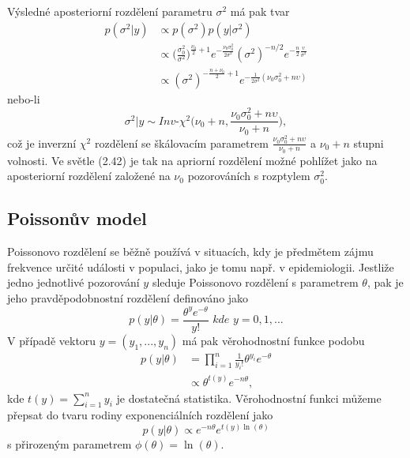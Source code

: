 Výsledné aposteriorní rozdělení parametru $\sigma^2$ má pak tvar
\begin{equation}
\begin{split}
p(\sigma^2 | y) & \varpropto p(\sigma^2)p(y | \sigma^2)\\
 & \varpropto \Big(\frac{\sigma_0^2}{\sigma^2}\Big)^{\frac{\nu_0}{2} + 1} e^{-\frac{\nu_0 \sigma_0^2}{2 \sigma^2}} (\sigma^2)^{-n/2} e^{-\frac{n}{2} \frac{\upsilon}{\sigma^2}}\\
  & \varpropto (\sigma^2) ^ {-\frac{n + \nu_0}{2} + 1}e^{-\frac{1}{2 \sigma^2}(\nu_0 \sigma^2_0 + n \upsilon)}
\end{split}
\end{equation}
nebo-li
\begin{equation}
\sigma^2 | y \sim \textit{Inv-}\chi^2 \Big(\nu_0 + n, \frac{\nu_0 \sigma_0^2 + n \upsilon}{\nu_0 + n} \Big),
\end{equation}
což je inverzní $\chi^2$ rozdělení se škálovacím parametrem $\frac{\nu_0 \sigma_0^2 + n \upsilon}{\nu_0 + n}$ a $\nu_0 + n$ stupni volnosti. Ve světle (2.42) je tak na apriorní rozdělení možné pohlížet jako na aposteriorní rozdělení založené na $\nu_0$ pozorováních s rozptylem $\sigma_0^2$.

\subsection{Poissonův model}

Poissonovo rozdělení se běžně používá v situacích, kdy je předmětem zájmu frekvence určité události v populaci, jako je tomu např. v epidemiologii. Jestliže jedno jednotlivé pozorování $y$ sleduje Poissonovo rozdělení s parametrem $\theta$, pak je jeho pravděpodobnostní rozdělení definováno jako
\begin{equation}
p(y|\theta) = \frac{\theta^y e^{-\theta}}{y!} \textit{ kde } y = 0, 1, ...
\end{equation}
V případě vektoru $y = (y_1, ..., y_n)$ má pak věrohodnostní funkce podobu
\begin{equation}
\begin{split}
p(y | \theta) & = \prod_{i = 1}^n \frac{1}{y_i!} \theta^{y_i} e^{-\theta}\\
 & \varpropto \theta^{t(y)}e^{-n \theta},
\end{split}
\end{equation}
kde $t(y) = \sum_{i = 1}^n y_i$ je dostatečná statistika. Věrohodnostní funkci můžeme přepsat do tvaru rodiny exponenciálních rozdělení jako
\begin{equation}
p(y | \theta) \varpropto e^{-n \theta} e^{t(y) \ln(\theta)}
\end{equation}
s přirozeným parametrem $\phi(\theta) = \ln(\theta)$.

